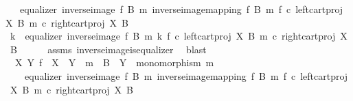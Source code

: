 \begin{isabellebody}
\ \ \ {\isachardoublequoteopen}equalizer\ {\isacharparenleft}{\kern0pt}inverse{\isacharunderscore}{\kern0pt}image\ f\ B\ m{\isacharparenright}{\kern0pt}\ {\isacharparenleft}{\kern0pt}inverse{\isacharunderscore}{\kern0pt}image{\isacharunderscore}{\kern0pt}mapping\ f\ B\ m{\isacharparenright}{\kern0pt}\ {\isacharparenleft}{\kern0pt}f\ {\isasymcirc}\isactrlsub c\ left{\isacharunderscore}{\kern0pt}cart{\isacharunderscore}{\kern0pt}proj\ X\ B{\isacharparenright}{\kern0pt}\ {\isacharparenleft}{\kern0pt}m\ {\isasymcirc}\isactrlsub c\ right{\isacharunderscore}{\kern0pt}cart{\isacharunderscore}{\kern0pt}proj\ X\ B{\isacharparenright}{\kern0pt}{\isachardoublequoteclose}\isanewline
%
\isadelimproof
%
\endisadelimproof
%
\isatagproof
{}\isamarkupfalse%
\ {\isacharminus}{\kern0pt}\isanewline
\ \ \isamarkupfalse%
\ k\ \ {\isachardoublequoteopen}equalizer\ {\isacharparenleft}{\kern0pt}inverse{\isacharunderscore}{\kern0pt}image\ f\ B\ m{\isacharparenright}{\kern0pt}\ k\ {\isacharparenleft}{\kern0pt}f\ {\isasymcirc}\isactrlsub c\ left{\isacharunderscore}{\kern0pt}cart{\isacharunderscore}{\kern0pt}proj\ X\ B{\isacharparenright}{\kern0pt}\ {\isacharparenleft}{\kern0pt}m\ {\isasymcirc}\isactrlsub c\ right{\isacharunderscore}{\kern0pt}cart{\isacharunderscore}{\kern0pt}proj\ X\ B{\isacharparenright}{\kern0pt}{\isachardoublequoteclose}\isanewline
\ \ \ \ \isamarkupfalse%
\ assms\ inverse{\isacharunderscore}{\kern0pt}image{\isacharunderscore}{\kern0pt}is{\isacharunderscore}{\kern0pt}equalizer\ \isamarkupfalse%
\ blast\isanewline
\ \ \isamarkupfalse%
\ \isamarkupfalse%
\ {\isachardoublequoteopen}{\isasymexists}\ X\ Y{\isachardot}{\kern0pt}\ f\ {\isacharcolon}{\kern0pt}\ X\ {\isasymrightarrow}\ Y\ {\isasymand}\ m\ {\isacharcolon}{\kern0pt}\ B\ {\isasymrightarrow}\ Y\ {\isasymand}\ monomorphism\ m\ {\isasymand}\isanewline
\ \ \ \ equalizer\ {\isacharparenleft}{\kern0pt}inverse{\isacharunderscore}{\kern0pt}image\ f\ B\ m{\isacharparenright}{\kern0pt}\ {\isacharparenleft}{\kern0pt}inverse{\isacharunderscore}{\kern0pt}image{\isacharunderscore}{\kern0pt}mapping\ f\ B\ m{\isacharparenright}{\kern0pt}\ {\isacharparenleft}{\kern0pt}f\ {\isasymcirc}\isactrlsub c\ left{\isacharunderscore}{\kern0pt}cart{\isacharunderscore}{\kern0pt}proj\ X\ B{\isacharparenright}{\kern0pt}\ {\isacharparenleft}{\kern0pt}m\ {\isasymcirc}\isactrlsub c\ right{\isacharunderscore}{\kern0pt}cart{\isacharunderscore}{\kern0pt}proj\ X\ B{\isacharparenright}{\kern0pt}{\isachardoublequoteclose}\isanewline

\end{isabellebody}
